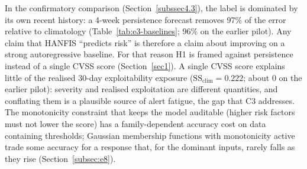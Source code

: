 \documentclass[referee,lineno,pdflatex,sn-basic]{sn-jnl}%
\theoremstyle{thmstyleone}%
\theoremstyle{thmstyletwo}%
\theoremstyle{thmstylethree}%
\begin{document}
In the confirmatory comparison (Section~\ref{subssec4.3}), the label is dominated by its own recent history: a 4-week persistence forecast removes 97\% of the error relative to climatology (Table~\ref{tab:e3-baselines}; 96\% on the earlier pilot). Any claim that HANFIS ``predicts risk'' is therefore a claim about improving on a strong autoregressive baseline. For that reason H1 is framed against persistence instead of a single CVSS score (Section~\ref{sec1}). A single CVSS score explains little of the realised 30-day exploitability exposure ($\mathrm{SS}_{\mathrm{clim}}=0.222$; about 0 on the earlier pilot): severity and realised exploitation are different quantities, and conflating them is a plausible source of alert fatigue, the gap that C3 addresses. The monotonicity constraint that keeps the model auditable (higher risk factors must not lower the score) has a family-dependent accuracy cost on data containing thresholds; Gaussian membership functions with monotonicity active trade some accuracy for a response that, for the dominant inputs, rarely falls as they rise (Section~\ref{subsec:e8}).
\end{document}
